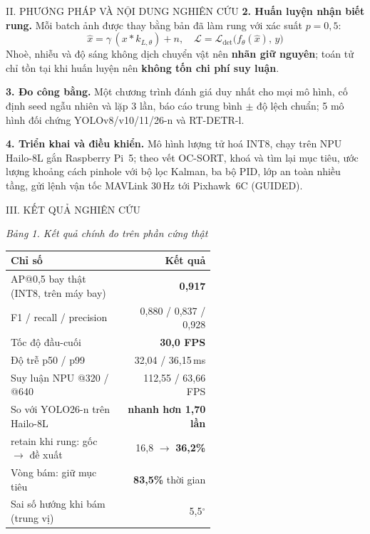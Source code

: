 \documentclass[10pt]{extarticle}
\newcommand{\so}[1]{\textbf{\color{dam}#1}}
\begin{document}
{{\begin{cotbox}{II. PHƯƠNG PHÁP VÀ NỘI DUNG NGHIÊN CỨU}
\textbf{2. Huấn luyện nhận biết rung.} Mỗi batch ảnh được thay bằng bản đã làm rung với xác suất $p = 0{,}5$:
\[
\hat x = \gamma\,(x * k_{L,\theta}) + n, \quad
\mathcal{L} = \mathcal{L}_{\det}\big(f_\theta(\hat x),\, y\big)
\]
Nhoè, nhiễu và độ sáng không dịch chuyển vật nên \textbf{nhãn giữ nguyên}; toán tử chỉ tồn tại khi huấn luyện nên \textbf{không tốn chi phí suy luận}.

\textbf{3. Đo công bằng.} Một chương trình đánh giá duy nhất cho mọi mô hình, cố định seed ngẫu nhiên và lặp 3 lần, báo cáo trung bình $\pm$ độ lệch chuẩn; 5 mô hình đối chứng YOLOv8/v10/11/26-n và RT-DETR-l.

\textbf{4. Triển khai và điều khiển.} Mô hình lượng tử hoá INT8, chạy trên NPU Hailo-8L gắn Raspberry Pi~5; theo vết OC-SORT, khoá và tìm lại mục tiêu, ước lượng khoảng cách pinhole với bộ lọc Kalman, ba bộ PID, lớp an toàn nhiều tầng, gửi lệnh vận tốc MAVLink 30\,Hz tới Pixhawk~6C (GUIDED).

\par{}
\end{cotbox}\hfill
\begin{cotbox}{III. KẾT QUẢ NGHIÊN CỨU}
{\centering\footnotesize\textit{Bảng 1. Kết quả chính đo trên phần cứng thật}\par}
{\centering\renewcommand{\arraystretch}{1.1}\setlength{\tabcolsep}{3pt}
\begin{tabular}{@{}>{\raggedright\arraybackslash}p{0.57\linewidth}r@{}}
\toprule
\textbf{Chỉ số} & \textbf{Kết quả}\\\midrule
AP@0,5 bay thật (INT8, trên máy bay) & \so{0,917}\\
F1 / recall / precision & 0,880 / 0,837 / 0,928\\
Tốc độ đầu-cuối & \so{30,0 FPS}\\
Độ trễ p50 / p99 & 32,04 / 36,15\,ms\\
Suy luận NPU @320 / @640 & 112,55 / 63,66 FPS\\
So với YOLO26-n trên Hailo-8L & \so{nhanh hơn 1,70 lần}\\
retain khi rung: gốc $\rightarrow$ đề xuất & 16,8 $\rightarrow$ \so{36,2\%}\\
Vòng bám: giữ mục tiêu & \so{83,5\%} thời gian\\
Sai số hướng khi bám (trung vị) & 5,5$^\circ$\\\bottomrule
\end{tabular}\par}


\end{cotbox}}}
\end{document}

